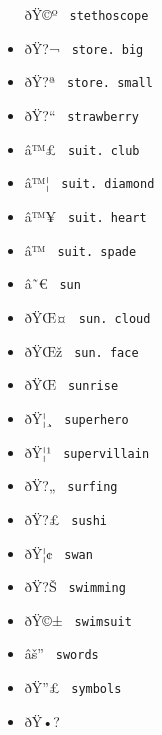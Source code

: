 \begin{itemize}
  \label{symbol-stethoscope}{{ ðŸ©º }
  \texttt{\ stethoscope\ }}
\item
  \label{symbol-store.big}{{ ðŸ?¬ }
  \texttt{\ store.\ big\ }}
\item
  \label{symbol-store.small}{{ ðŸ?ª }
  \texttt{\ store.\ small\ }}
\item
  \label{symbol-strawberry}{{ ðŸ?{}`` }
  \texttt{\ strawberry\ }}
\item
  \label{symbol-suit.club}{{ â™£ }
  \texttt{\ suit.\ club\ }}
\item
  \label{symbol-suit.diamond}{{ â™¦ }
  \texttt{\ suit.\ diamond\ }}
\item
  \label{symbol-suit.heart}{{ â™¥ }
  \texttt{\ suit.\ heart\ }}
\item
  \label{symbol-suit.spade}{{ â™ }
  \texttt{\ suit.\ spade\ }}
\item
  \label{symbol-sun}{{ â˜€ } \texttt{\ sun\ }}
\item
  \label{symbol-sun.cloud}{{ ðŸŒ¤ }
  \texttt{\ sun.\ cloud\ }}
\item
  \label{symbol-sun.face}{{ ðŸŒž }
  \texttt{\ sun.\ face\ }}
\item
  \label{symbol-sunrise}{{ ðŸŒ } \texttt{\ sunrise\ }}
\item
  \label{symbol-superhero}{{ ðŸ¦¸ }
  \texttt{\ superhero\ }}
\item
  \label{symbol-supervillain}{{ ðŸ¦¹ }
  \texttt{\ supervillain\ }}
\item
  \label{symbol-surfing}{{ ðŸ?„ } \texttt{\ surfing\ }}
\item
  \label{symbol-sushi}{{ ðŸ?£ } \texttt{\ sushi\ }}
\item
  \label{symbol-swan}{{ ðŸ¦¢ } \texttt{\ swan\ }}
\item
  \label{symbol-swimming}{{ ðŸ?Š } \texttt{\ swimming\ }}
\item
  \label{symbol-swimsuit}{{ ðŸ©± } \texttt{\ swimsuit\ }}
\item
  \label{symbol-swords}{{ âš'' } \texttt{\ swords\ }}
\item
  \label{symbol-symbols}{{ ðŸ''£ } \texttt{\ symbols\ }}
\item
  \label{symbol-synagogue}{{ ðŸ•? }
}
\end{itemize}
